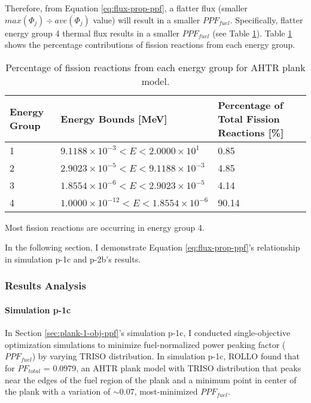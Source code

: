 Therefore, from Equation \ref{eq:flux-prop-ppf}, a flatter flux (smaller 
$max(\Phi_j) \div ave(\Phi_j)$ value) will result in a smaller $PPF_{fuel}$. 
Specifically, flatter energy group 4 thermal flux results in a smaller $PPF_{fuel}$
(see Table \ref{tab:fission-flux}). 
Table \ref{tab:fission-flux} shows the percentage contributions of fission reactions from 
each energy group. 
\begin{table}[htbp!]
    \centering
    \onehalfspacing
    \caption{Percentage of fission reactions from each energy group for \gls{AHTR} plank model.}
	\label{tab:fission-flux}
    \footnotesize
    \begin{tabular}{llp{4cm}}
    \hline 
    \textbf{Energy Group} & \textbf{Energy Bounds [MeV]} & \textbf{Percentage of Total Fission Reactions [\%]} \\
    \hline
    1 & $9.1188\times 10^{-3} < E < 2.0000\times 10^1$ & 0.85 \\ 
    2 & $2.9023\times 10^{-5} < E < 9.1188\times 10^{-3}$ & 4.85 \\
    3 & $1.8554\times 10^{-6} < E < 2.9023\times 10^{-5}$ & 4.14 \\
    4 & $1.0000\times 10^{-12} < E < 1.8554\times 10^{-6}$ & 90.14 \\
    \hline
    \end{tabular}
\end{table}
Most fission reactions are occurring in energy group 4. 

In the following section, I demonstrate Equation \ref{eq:flux-prop-ppf}'s relationship 
in simulation p-1c and p-2b's results. 

\subsubsection{Results Analysis}
\label{sec:plank-discussion-ppf-results}

\paragraph{Simulation p-1c}
In Section \ref{sec:plank-1-obj-ppf}'s simulation p-1c, I conducted single-objective 
optimization simulations to minimize fuel-normalized power peaking factor ($PPF_{fuel}$) 
by varying TRISO distribution. 
In simulation p-1c, \gls{ROLLO} found that for $PF_{total}$ = 0.0979, an \gls{AHTR} 
plank model with TRISO distribution that peaks near the edges of the fuel region of 
the plank and a minimum point in center of the plank with a variation of $\sim0.07$, 
most-minimized $PPF_{fuel}$. 

